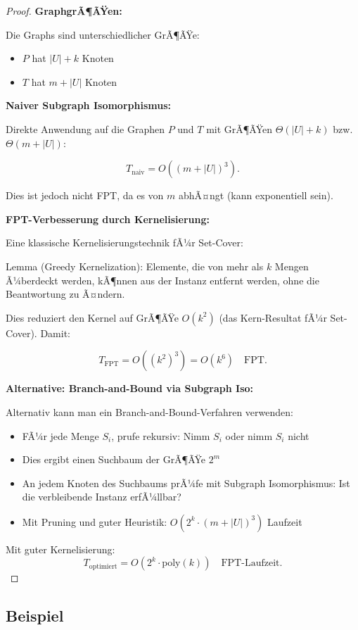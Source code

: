 ﻿\documentclass[a4paper,12pt]{article}
\theoremstyle{definition}
\begin{document}
\begin{proof}
	\textbf{GraphgrÃ¶ÃŸen:}
	
	Die Graphs sind unterschiedlicher GrÃ¶ÃŸe:
	\begin{itemize}
		\item $P$ hat $|U| + k$ Knoten
		\item $T$ hat $m + |U|$ Knoten
	\end{itemize}
	
	\textbf{Naiver Subgraph Isomorphismus:}
	
	Direkte Anwendung auf die Graphen $P$ und $T$ mit GrÃ¶ÃŸen $\Theta(|U| + k)$ bzw. $\Theta(m + |U|)$:
	
	\[
	T_{\text{naiv}} = O((m + |U|)^3).
	\]
	
	Dies ist jedoch nicht FPT, da es von $m$ abhÃ¤ngt (kann exponentiell sein).
	
	\textbf{FPT-Verbesserung durch Kernelisierung:}
	
	Eine klassische Kernelisierungstechnik fÃ¼r Set-Cover:
	
	Lemma (Greedy Kernelization): Elemente, die von mehr als $k$ Mengen Ã¼berdeckt werden, kÃ¶nnen aus der Instanz entfernt werden, ohne die Beantwortung zu Ã¤ndern.
	
	Dies reduziert den Kernel auf GrÃ¶ÃŸe $O(k^2)$ (das Kern-Resultat fÃ¼r Set-Cover). Damit:
	
	\[
	T_{\text{FPT}} = O((k^2)^3) = O(k^6) \quad \text{FPT.}
	\]
	
	\textbf{Alternative: Branch-and-Bound via Subgraph Iso:}
	
	Alternativ kann man ein Branch-and-Bound-Verfahren verwenden:
	\begin{itemize}
		\item FÃ¼r jede Menge $S_i$, prufe rekursiv: Nimm $S_i$ oder nimm $S_i$ nicht
		\item Dies ergibt einen Suchbaum der GrÃ¶ÃŸe $2^m$
		\item An jedem Knoten des Suchbaums prÃ¼fe mit Subgraph Isomorphismus: Ist die verbleibende Instanz erfÃ¼llbar?
		\item Mit Pruning und guter Heuristik: $O(2^k \cdot (m + |U|)^3)$ Laufzeit
	\end{itemize}
	
	Mit guter Kernelisierung:
	\[
	T_{\text{optimiert}} = O(2^k \cdot \text{poly}(k)) \quad \text{FPT-Laufzeit}.
	\]
\end{proof}

\subsection{Beispiel}
\end{document}
